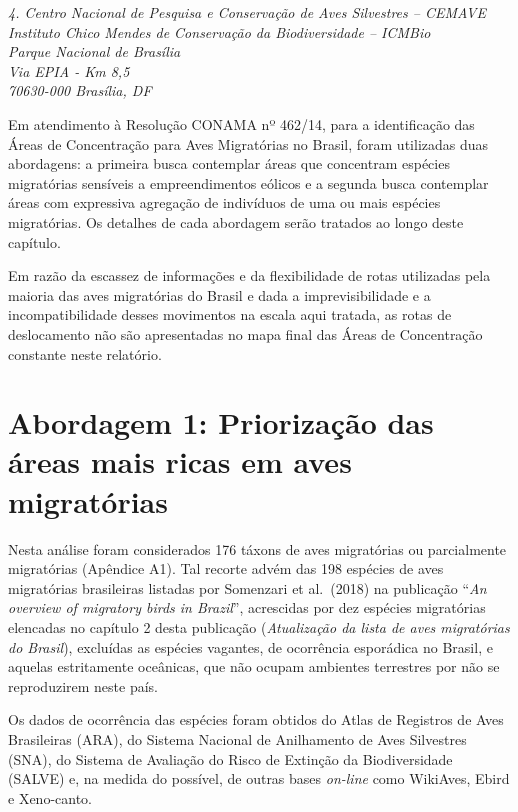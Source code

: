 \documentclass[
  oneside]{scrbook}
\begin{document}
\emph{4. Centro Nacional de Pesquisa e Conservação de Aves Silvestres -- CEMAVE}\\
\emph{Instituto Chico Mendes de Conservação da Biodiversidade -- ICMBio}\\
\emph{Parque Nacional de Brasília}\\
\emph{Via EPIA - Km 8,5}\\
\emph{70630-000 Brasília, DF}

Em atendimento à Resolução CONAMA nº 462/14, para a identificação das Áreas de Concentração para Aves Migratórias no Brasil, foram utilizadas duas abordagens: a primeira busca contemplar áreas que concentram espécies migratórias sensíveis a empreendimentos eólicos e a segunda busca contemplar áreas com expressiva agregação de indivíduos de uma ou mais espécies migratórias. Os detalhes de cada abordagem serão tratados ao longo deste capítulo.

Em razão da escassez de informações e da flexibilidade de rotas utilizadas pela maioria das aves migratórias do Brasil e dada a imprevisibilidade e a incompatibilidade desses movimentos na escala aqui tratada, as rotas de deslocamento não são apresentadas no mapa final das Áreas de Concentração constante neste relatório.

\hypertarget{abordagem-1-priorizauxe7uxe3o-das-uxe1reas-mais-ricas-em-aves-migratuxf3rias}{%
\section{Abordagem 1: Priorização das áreas mais ricas em aves migratórias}\label{abordagem-1-priorizauxe7uxe3o-das-uxe1reas-mais-ricas-em-aves-migratuxf3rias}}

Nesta análise foram considerados 176 táxons de aves migratórias ou parcialmente migratórias (Apêndice A1). Tal recorte advém das 198 espécies de aves migratórias brasileiras listadas por Somenzari et al.~(2018) na publicação ``\emph{An overview of migratory birds in Brazil}'', acrescidas por dez espécies migratórias elencadas no capítulo 2 desta publicação (\emph{Atualização da lista de aves migratórias do Brasil}), excluídas as espécies vagantes, de ocorrência esporádica no Brasil, e aquelas estritamente oceânicas, que não ocupam ambientes terrestres por não se reproduzirem neste país.

Os dados de ocorrência das espécies foram obtidos do Atlas de Registros de Aves Brasileiras (ARA), do Sistema Nacional de Anilhamento de Aves Silvestres (SNA), do Sistema de Avaliação do Risco de Extinção da Biodiversidade (SALVE) e, na medida do possível, de outras bases \emph{on-line} como WikiAves, Ebird e Xeno-canto.
\end{document}
